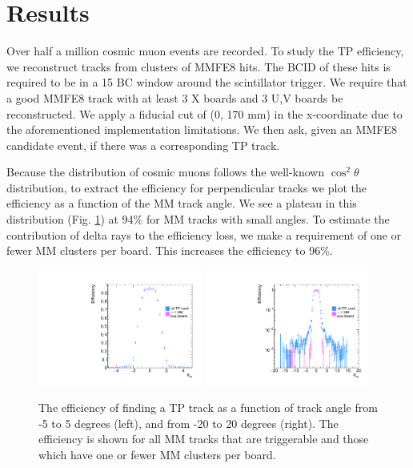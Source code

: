 \section{Results}
\label{sec:results}

Over half a million cosmic muon events are recorded. To study the TP efficiency, we reconstruct tracks from clusters of MMFE8 hits. The BCID of these hits is required to be in a 15 BC window around the scintillator trigger. We require that a good MMFE8 track with at least 3 X boards and 3 U,V boards be reconstructed. We apply a fiducial cut of (0, 170 mm) in the x-coordinate due to the aforementioned implementation limitations. We then ask, given an MMFE8 candidate event, if there was a corresponding TP track. 
\par Because the distribution of cosmic muons follows the well-known $\cos^2 \theta$ distribution, to extract the efficiency for perpendicular tracks we plot the efficiency as a function of the MM track angle. We see a plateau in this distribution (Fig. \ref{fig:data}) at 94\% for MM tracks with small angles. To estimate the contribution of delta rays to the efficiency loss, we make a requirement of one or fewer MM clusters per board. This increases the efficiency to 96\%. 

\begin{figure}[!htpb]
  \begin{center}
    \includegraphics[width=0.48\textwidth]{figures/tpeff_vs_theta_zoom.pdf}
    \includegraphics[width=0.48\textwidth]{figures/tpeff_vs_theta_log.pdf}
  \end{center}
  \vspace{-10pt}
  \caption{The efficiency of finding a TP track as a function of track angle from -5 to 5 degrees (left), and from -20 to 20 degrees (right). The efficiency is shown for all MM tracks that are triggerable and those which have one or fewer MM clusters per board.}
  \label{fig:data}
\end{figure}
\FloatBarrier

